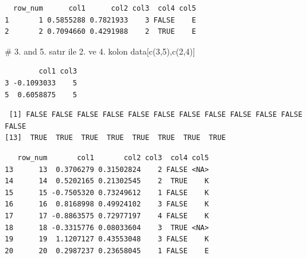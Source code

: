 \documentclass[
  letterpaper,
  DIV=11,
  numbers=noendperiod]{scrreprt}
\newenvironment{Shaded}{\begin{snugshade}}{\end{snugshade}}
\newcommand{\CommentTok}[1]{\textcolor[rgb]{0.37,0.37,0.37}{#1}}
\newcommand{\DecValTok}[1]{\textcolor[rgb]{0.68,0.00,0.00}{#1}}
\newcommand{\FunctionTok}[1]{\textcolor[rgb]{0.28,0.35,0.67}{#1}}
\newcommand{\NormalTok}[1]{\textcolor[rgb]{0.00,0.23,0.31}{#1}}
\newcommand{\SpecialCharTok}[1]{\textcolor[rgb]{0.37,0.37,0.37}{#1}}
\begin{document}
\begin{verbatim}
  row_num      col1      col2 col3  col4 col5
1       1 0.5855288 0.7821933    3 FALSE    E
2       2 0.7094660 0.4291988    2  TRUE    E
\end{verbatim}

\begin{Shaded}
\begin{Highlighting}[]
\CommentTok{\# 3. and 5. satır ile 2. ve 4. kolon}
\NormalTok{data[}\FunctionTok{c}\NormalTok{(}\DecValTok{3}\NormalTok{,}\DecValTok{5}\NormalTok{),}\FunctionTok{c}\NormalTok{(}\DecValTok{2}\NormalTok{,}\DecValTok{4}\NormalTok{)]}
\end{Highlighting}
\end{Shaded}

\begin{verbatim}
        col1 col3
3 -0.1093033    5
5  0.6058875    5
\end{verbatim}

\begin{Shaded}
\end{Shaded}

\begin{verbatim}
 [1] FALSE FALSE FALSE FALSE FALSE FALSE FALSE FALSE FALSE FALSE FALSE FALSE
[13]  TRUE  TRUE  TRUE  TRUE  TRUE  TRUE  TRUE  TRUE
\end{verbatim}

\begin{Shaded}
\end{Shaded}

\begin{verbatim}
   row_num       col1       col2 col3  col4 col5
13      13  0.3706279 0.31502824    2 FALSE <NA>
14      14  0.5202165 0.21302545    2  TRUE    K
15      15 -0.7505320 0.73249612    1 FALSE    K
16      16  0.8168998 0.49924102    3 FALSE    K
17      17 -0.8863575 0.72977197    4 FALSE    K
18      18 -0.3315776 0.08033604    3  TRUE <NA>
19      19  1.1207127 0.43553048    3 FALSE    K
20      20  0.2987237 0.23658045    1 FALSE    E
\end{verbatim}
\end{document}
